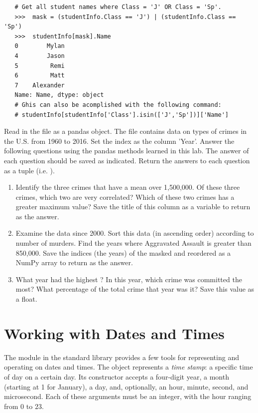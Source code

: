 \begin{lstlisting}
   # Get all student names where Class = 'J' OR Class = 'Sp'.
   >>>  mask = (studentInfo.Class == 'J') | (studentInfo.Class == 'Sp')
   >>>  studentInfo[mask].Name
   0        Mylan
   4        Jason
   5         Remi
   6         Matt
   7    Alexander
   Name: Name, dtype: object
   # Ghis can also be acomplished with the following command:
   # studentInfo[studentInfo['Class'].isin(['J','Sp'])]['Name']
\end{lstlisting}

\begin{problem}\label{prob:rate}
Read in the file  as a pandas object.
The file contains data on types of crimes in the U.S. from 1960 to 2016.
Set the index as the column 'Year'.
Answer the following questions using the pandas methods learned in this lab.
The answer of each question should be saved as indicated.
Return the answers to each question as a tuple (i.e. ).

\begin{enumerate}
	\item Identify the three crimes that have a mean over 1,500,000.
	Of these three crimes, which two are very correlated?
	Which of these two crimes has a greater maximum value?
	Save the title of this column as a variable to return as the answer.
	\item Examine the data since 2000.
	Sort this data (in ascending order) according to number of murders.
	Find the years where Aggravated Assault is greater than 850,000.
   Save the indices (the years) of the masked and reordered  as a NumPy array to return as the answer.
	\item What year had the highest ?
	In this year, which crime was committed the most?
	What percentage of the total crime that year was it?
	Save this value as a float.
\end{enumerate}
\end{problem}


\section*{Working with Dates and Times} %

The  module in the standard library provides a few tools for representing and operating on dates and times.
The  object represents a \emph{time stamp}: a specific time of day on a certain day.
Its constructor accepts a four-digit year, a month (starting at 1 for January), a day, and, optionally, an hour, minute, second, and microsecond.
Each of these arguments must be an integer, with the hour ranging from $0$ to $23$.

